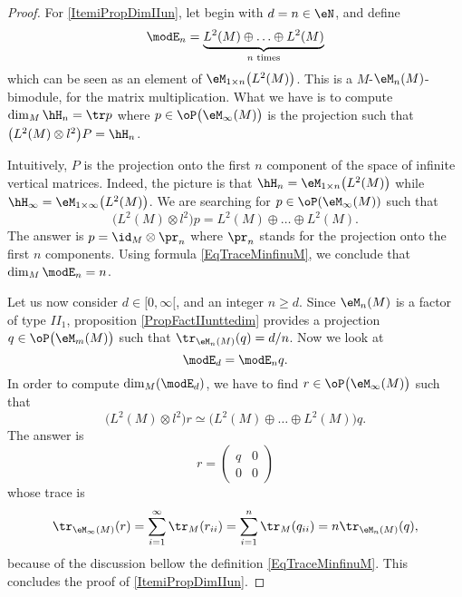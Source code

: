 \begin{proof}

	For \ref{ItemiPropDimIIun}, let begin with $d=n\in \eN$, and define
	\begin{equation}
		\modE_n=\underbrace{  L^2(M)\oplus\ldots\oplus L^2(M)   }_{\text{$n$ times}}
	\end{equation}
	which can be seen as an element of $\eM_{1\times n}\big( L^2(M) \big)$. This is a $M$-$\eM_n(M)$-bimodule, for the matrix multiplication. What we have is to compute $\dim_{M}\hH_n=\tr p$ where $p\in\oP\big( \eM_{\infty}(M) \big)$ is the projection such that $\big( L^2(M)\otimes l^2 \big)P=\hH_n$. 
	
	Intuitively, $P$ is the projection onto the first $n$ component of the space of infinite vertical matrices. Indeed, the picture is that $\hH_n=\eM_{1\times n}\big( L^2(M) \big)$ while $\hH_{\infty}=\eM_{1\times \infty}\big( L^2(M) \big)$. We are searching for $p\in\oP(\eM_{\infty}(M))$ such that 
	\begin{equation}
		\big( L^2(M)\otimes l^2 \big)p=L^2(M)\oplus\ldots\oplus L^2(M).
	\end{equation}
	The answer is $p=\id_{M}\otimes \pr_n$ where $\pr_n$ stands for the projection onto the first $n$ components. Using formula \eqref{EqTraceMinfinuM}, we conclude that $\dim_M\modE_n=n$. 

	Let us now consider $d\in[0,\infty[$, and an integer $n\geq d$. Since $\eM_n(M)$ is a factor of type $II_1$, proposition \ref{PropFactIIunttedim} provides a projection $q\in\oP\big( \eM_m(M) \big)$ such that $\tr_{\eM_n(M)}(q)=d/n$. Now we look at
	\begin{equation}
		\modE_d=\modE_nq.
	\end{equation}
	In order to compute $\dim_M(\modE_d)$, we have to find $r\in\oP\big( \eM_{\infty}(M) \big)$ such that
	\begin{equation}
		\big( L^2(M)\otimes l^2 \big)r\simeq \big( L^2(M)\oplus\ldots\oplus L^2(M) \big)q.
	\end{equation}
	The answer is
	\begin{equation}
		r=
	\begin{pmatrix}
	  q	&	0	\\ 
	  0	&	0	
	\end{pmatrix}
	\end{equation}
	whose trace is 
	\begin{equation}
		\tr_{\eM_{\infty}(M)}(r)=\sum_{i=1}^{\infty}\tr_M(r_{ii})=\sum_{i=1}^n\tr_M(q_{ii})=n\tr_{\eM_n(M)}(q),
	\end{equation}
	because of the discussion bellow the definition \eqref{EqTraceMinfinuM}. This concludes the proof of \ref{ItemiPropDimIIun}.
	

\end{proof}
